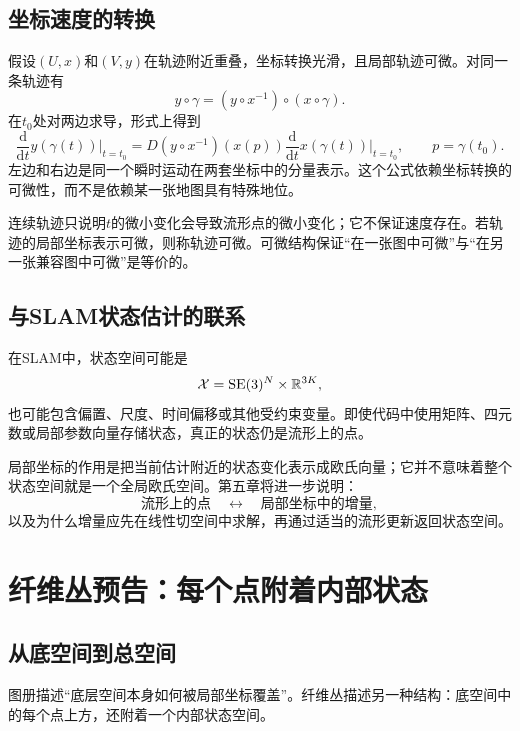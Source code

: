 \subsection{坐标速度的转换}

假设$(U,x)$和$(V,y)$在轨迹附近重叠，坐标转换光滑，且局部轨迹可微。对同一条轨迹有
\[
    y\circ\gamma
    =
    (y\circ x^{-1})\circ(x\circ\gamma).
\]
在$t_0$处对两边求导，形式上得到
\[
    \frac{\mathrm d}{\mathrm dt}y(\gamma(t))\bigg|_{t=t_0}
    =
    D(y\circ x^{-1})(x(p))
    \frac{\mathrm d}{\mathrm dt}x(\gamma(t))\bigg|_{t=t_0},
    \qquad p=\gamma(t_0).
\]
左边和右边是同一个瞬时运动在两套坐标中的分量表示。这个公式依赖坐标转换的可微性，而不是依赖某一张地图具有特殊地位。

\begin{remark}[连续与可微是两件事]
连续轨迹只说明$t$的微小变化会导致流形点的微小变化；它不保证速度存在。若轨迹的局部坐标表示可微，则称轨迹可微。可微结构保证“在一张图中可微”与“在另一张兼容图中可微”是等价的。
\end{remark}

\subsection{与SLAM状态估计的联系}

在SLAM中，状态空间可能是
\[
    \mathcal X
    =
    \operatorname{SE}(3)^N\times\mathbb{R}^{3K},
\]
也可能包含偏置、尺度、时间偏移或其他受约束变量。即使代码中使用矩阵、四元数或局部参数向量存储状态，真正的状态仍是流形上的点。

局部坐标的作用是把当前估计附近的状态变化表示成欧氏向量；它并不意味着整个状态空间就是一个全局欧氏空间。第五章将进一步说明：
\[
    \text{流形上的点}
    \quad\longleftrightarrow\quad
    \text{局部坐标中的增量},
\]
以及为什么增量应先在线性切空间中求解，再通过适当的流形更新返回状态空间。


\section{纤维丛预告：每个点附着内部状态}

\subsection{从底空间到总空间}

图册描述“底层空间本身如何被局部坐标覆盖”。纤维丛描述另一种结构：底空间中的每个点上方，还附着一个内部状态空间。

